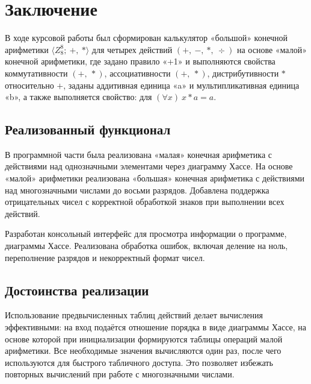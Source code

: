 \section*{Заключение}

В ходе курсовой работы был сформирован калькулятор «большой» конечной арифметики
\(\langle Z^8_8;\ +,\ * \rangle\) для четырех действий
\((+,\ -,\ *,\ \div)\) на основе «малой» конечной арифметики, где задано
правило «+1» и выполняются свойства коммутативности \((+,\ *)\),
ассоциативности \((+,\ *)\), дистрибутивности \(*\) относительно \(+\),
заданы аддитивная единица «a» и мультипликативная единица «b», а также
выполняется свойство: для \((\forall x)\ x * a = a.\)

\subsection*{Реализованный функционал}

В программной части была реализована «малая» конечная арифметика с действиями над однозначными элементами через диаграмму Хассе.
На основе «малой» арифметики реализована «большая» конечная арифметика с действиями над многозначными числами до восьми разрядов.  Добавлена поддержка отрицательных чисел с корректной обработкой знаков при выполнении всех действий.

Разработан консольный интерфейс для просмотра информации о программе, диаграммы Хассе.  Реализована обработка ошибок, включая деление на ноль, переполнение разрядов и некорректный формат чисел.

\subsection*{Достоинства реализации}

Использование предвычисленных таблиц действий делает вычисления эффективными: на вход подаётся отношение порядка в виде диаграммы Хассе, на основе которой при инициализации формируются таблицы операций малой арифметики. Все необходимые значения вычисляются один раз, после чего используются для быстрого табличного доступа. Это позволяет избежать повторных вычислений при работе с многозначными числами.


